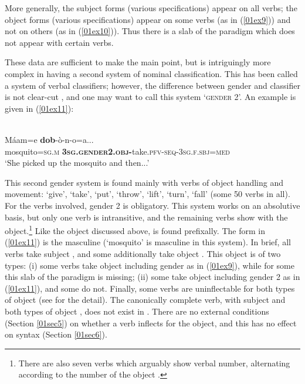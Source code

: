 \documentclass[output=paper,colorlinks,citecolor=brown]{langscibook}
\begin{document}
More generally, the subject  forms (various specifications) appear on all verbs; the object  forms (various specifications) appear on some verbs (as in (\ref{01ex9})) and not on others (as in (\ref{01ex10})). Thus there is a slab of the paradigm which does not appear with certain verbs.

These data are sufficient to make the main point, but  is intriguingly more complex in having a second system of nominal classification. This has been called a system of verbal classifiers; however, the difference between gender and classifier is not clear-cut \citep{corbettfeddenfinkel2017}, and one may want to call this system `\textsc{gender 2}'. An example is given in (\ref{01ex11}):

\begin{exe}
	\ex {} \citep[288]{fedden2022} \label{01ex11} \\
	\gll Máam=e	\textbf{dob}-ò-n-o=a... \\
	mosquito=\textsc{sg.m}	\textbf{\textsc{3sg.gender2.obj-}}take.\textsc{pfv-seq-3sg.f.sbj=med} \\
	\trans ‘She picked up the mosquito and then...’
\end{exe}

This second gender system is found mainly with verbs of object handling and movement: `give', `take', `put', `throw', `lift', `turn', `fall' (some 50 verbs in all). For the verbs involved, gender 2 is obligatory. This system works on an absolutive basis, but only one verb is intransitive, and the remaining verbs show  with the object.\footnote{There are also seven verbs which arguably show verbal number, alternating according to the number of the object \citep[311--314]{fedden2019}.} Like the object  discussed above,  is found prefixally. The form in (\ref{01ex11}) is the masculine (`mosquito' is masculine in this system). In brief, all verbs take subject , and some additionally take object . This object  is of two types: (i) some verbs take object  including gender as in (\ref{01ex9}), while for some this slab of the paradigm is missing; (ii) some take object  including gender 2 as in (\ref{01ex11}), and some do not. Finally, some verbs are uninflectable for both types of object  (see \citealt{corbettfeddenfinkel2017} for the detail). The canonically complete verb, with subject  and both types of object , does not exist in . There are no external conditions (Section \ref{01sec5}) on whether a verb inflects for the object, and this has no effect on syntax (Section \ref{01sec6}).
\end{document}
